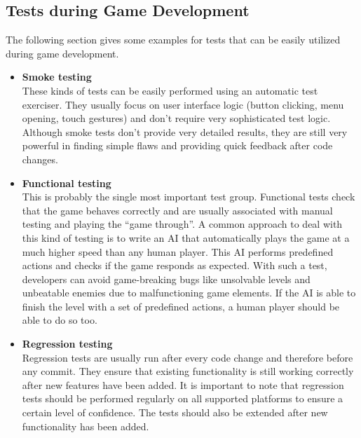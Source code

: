     \subsection{Tests during Game Development}
        The following section gives some examples for tests that can be easily utilized during game development.

        \begin{itemize}
            \item \textbf{Smoke testing} \\
                    These kinds of tests can be easily performed using an automatic test exerciser.
                    They usually focus on user interface logic (button clicking, menu opening, touch gestures)
                    and don't require very sophisticated test logic. 
                    Although smoke tests don't provide very detailed results, they are still very powerful in
                    finding simple flaws and providing quick feedback after code changes. 
            \item \textbf{Functional testing} \\
                    This is probably the single most important test group.
                    Functional tests check that the game behaves correctly and are usually associated with manual testing and playing the ``game through''. 
                    A common approach to deal with this kind of testing is to write an AI that automatically plays the game at a much higher speed than any human player.
                    This AI performs predefined actions and checks if the game responds as expected.
                    With such a test, developers can avoid game-breaking bugs like unsolvable levels and unbeatable enemies due to malfunctioning game elements.
                    If the AI is able to finish the level with a set of predefined actions, a human player should be able to do so too. 
            \item \textbf{Regression testing} \\
                    Regression tests are usually run after every code change and therefore before any commit.
                    They ensure that existing functionality is still working correctly after new features have been added.
                    It is important to note that regression tests should be performed regularly on all supported platforms to
                    ensure a certain level of confidence. 
                    The tests should also be extended after new functionality has been added.

\end{itemize}
